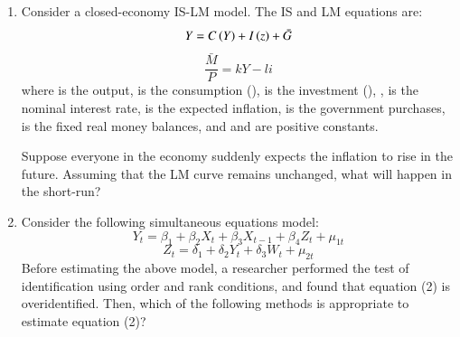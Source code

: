\documentclass[12pt]{article}
\theoremstyle{remark}
\begin{document}
\begin{enumerate}
\begin{enumerate}
 \end{enumerate}
\hfill{}
\item  Consider a closed-economy IS-LM model. The IS and LM equations are:
$$
Y = C \left(Y\right) + I \left(z\right) + \bar{G}
$$
$$
\frac{\bar{M}}{P} = kY - li
$$
where  is the output,  is the consumption (),  is the investment (), ,  is the nominal interest rate,  is the expected inflation,  is the government purchases,  is the fixed real money balances, and  and  are positive constants. 

Suppose everyone in the economy suddenly expects the inflation to rise in the future. Assuming that the LM curve remains unchanged, what will happen in the short-run? \\
\begin{enumerate}  \end{enumerate}
\hfill{}
\item Consider the following simultaneous equations model:
$$
Y_t = \beta_1 + \beta_2 X_t + \beta_3 X_{t-1} + \beta_4 Z_t + \mu_{1t} 
$$
$$
Z_t = \delta_1 + \delta_2 Y_t + \delta_3 W_t + \mu_{2t} 
$$
Before estimating the above model, a researcher performed the test of identification using order and rank conditions, and found that equation (2) is overidentified. Then, which of the following methods is appropriate to estimate equation (2)? \newline
\begin{enumerate}  \end{enumerate}

\end{enumerate}
\end{document}
